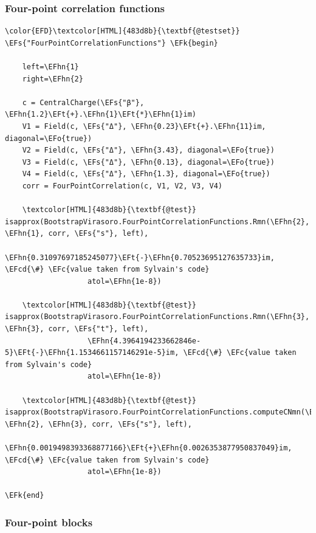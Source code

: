 \documentclass[a4paper]{article}
\numberwithin{equation}{section}
\newcommand{\EFc}[1]{\textcolor{EFc}{#1}} %
\newcommand{\EFcd}[1]{\textcolor{EFcd}{#1}} %
\newcommand{\EFs}[1]{\textcolor{EFs}{#1}} %
\newcommand{\EFk}[1]{\textcolor{EFk}{#1}} %
\newcommand{\EFt}[1]{\textcolor{EFt}{#1}} %
\newcommand{\EFo}[1]{\textcolor{EFo}{#1}} %
\newcommand{\EFhn}[1]{\textcolor{EFhn}{#1}} %
\begin{document}
\subsubsection*{Four-point correlation functions}
\label{sec:org288dd68}

\begin{Code}
\begin{Verbatim}
\color{EFD}\textcolor[HTML]{483d8b}{\textbf{@testset}} \EFs{"FourPointCorrelationFunctions"} \EFk{begin}

    left=\EFhn{1}
    right=\EFhn{2}

    c = CentralCharge(\EFs{"β"}, \EFhn{1.2}\EFt{+}.\EFhn{1}\EFt{*}\EFhn{1}im)
    V1 = Field(c, \EFs{"Δ"}, \EFhn{0.23}\EFt{+}.\EFhn{11}im, diagonal=\EFo{true})
    V2 = Field(c, \EFs{"Δ"}, \EFhn{3.43}, diagonal=\EFo{true})
    V3 = Field(c, \EFs{"Δ"}, \EFhn{0.13}, diagonal=\EFo{true})
    V4 = Field(c, \EFs{"Δ"}, \EFhn{1.3}, diagonal=\EFo{true})
    corr = FourPointCorrelation(c, V1, V2, V3, V4)

    \textcolor[HTML]{483d8b}{\textbf{@test}} isapprox(BootstrapVirasoro.FourPointCorrelationFunctions.Rmn(\EFhn{2}, \EFhn{1}, corr, \EFs{"s"}, left),
                   \EFhn{0.31097697185245077}\EFt{-}\EFhn{0.70523695127635733}im, \EFcd{\#} \EFc{value taken from Sylvain's code}
                   atol=\EFhn{1e-8})

    \textcolor[HTML]{483d8b}{\textbf{@test}} isapprox(BootstrapVirasoro.FourPointCorrelationFunctions.Rmn(\EFhn{3}, \EFhn{3}, corr, \EFs{"t"}, left),
                   \EFhn{4.3964194233662846e-5}\EFt{-}\EFhn{1.1534661157146291e-5}im, \EFcd{\#} \EFc{value taken from Sylvain's code}
                   atol=\EFhn{1e-8})

    \textcolor[HTML]{483d8b}{\textbf{@test}} isapprox(BootstrapVirasoro.FourPointCorrelationFunctions.computeCNmn(\EFhn{7}, \EFhn{2}, \EFhn{3}, corr, \EFs{"s"}, left),
                   \EFhn{0.0019498393368877166}\EFt{+}\EFhn{0.0026353877950837049}im, \EFcd{\#} \EFc{value taken from Sylvain's code}
                   atol=\EFhn{1e-8})

\EFk{end}
\end{Verbatim}
\end{Code}
\subsubsection*{Four-point blocks}
\label{sec:org8d273f5}
\end{document}
